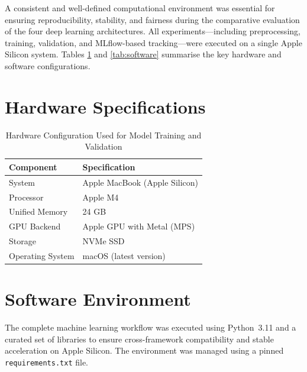 

A consistent and well-defined computational environment was essential for ensuring reproducibility, stability, and fairness during the comparative evaluation of the four deep learning architectures. All experiments—including preprocessing, training, validation, and MLflow-based tracking—were executed on a single Apple Silicon system. Tables \ref{tab:hardware} and \ref{tab:software} summarise the key hardware and software configurations.

\section{Hardware Specifications}

\begin{table}[H]
\centering
\caption{Hardware Configuration Used for Model Training and Validation}
\label{tab:hardware}
\begin{tabular}{|l|l|}
\hline
\textbf{Component} & \textbf{Specification} \\ \hline
System & Apple MacBook (Apple Silicon) \\ \hline
Processor & Apple M4 \\ \hline
Unified Memory & 24 GB \\ \hline
GPU Backend & Apple GPU with Metal (MPS) \\ \hline
Storage & NVMe SSD \\ \hline
Operating System & macOS (latest version) \\ \hline
\end{tabular}
\end{table}

\section{Software Environment}

The complete machine learning workflow was executed using Python~3.11 and a curated set of libraries to ensure cross-framework compatibility and stable acceleration on Apple Silicon. The environment was managed using a pinned \texttt{requirements.txt} file.

